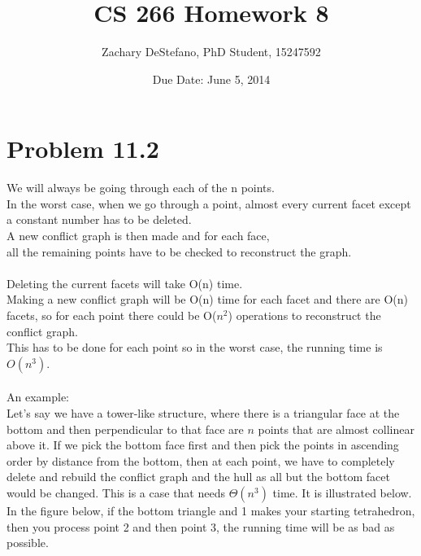 \documentclass[11pt,psfig]{article}
\begin{document}
\setlength{\parskip}{1.2ex plus0.3ex minus 0.3ex}


\thispagestyle{empty} \pagestyle{myheadings} 



\title{CS 266 Homework 8}
\author{Zachary DeStefano, PhD Student, 15247592}
\date{Due Date: June 5, 2014}

\maketitle

\vfill\eject

\section*{Problem 11.2}

We will always be going through each of the n points. \\
In the worst case, when we go through a point, almost every current facet except a constant number has to be deleted.\\
A new conflict graph is then made and for each face, \\
all the remaining points have to be checked to reconstruct the graph. \\
\\
Deleting the current facets will take O(n) time. \\
Making a new conflict graph will be O(n) time for each facet and there are O(n) facets, so for each point there could be O($n^2$) operations to reconstruct the conflict graph. \\
This has to be done for each point so in the worst case, the running time is $O(n^3)$. \\
\\
An example:\\
Let's say we have a tower-like structure, where there is a triangular face at the bottom and then perpendicular to that face are $n$ points that are almost collinear above it. If we pick the bottom face first and then pick the points in ascending order by distance from the bottom, then at each point, we have to completely delete and rebuild the conflict graph and the hull as all but the bottom facet would be changed. This is a case that needs $\Theta(n^3)$ time. It is illustrated below. In the figure below, if the bottom triangle and 1 makes your starting tetrahedron, then you process point 2 and then point 3, the running time will be as bad as possible. 
\end{document}
